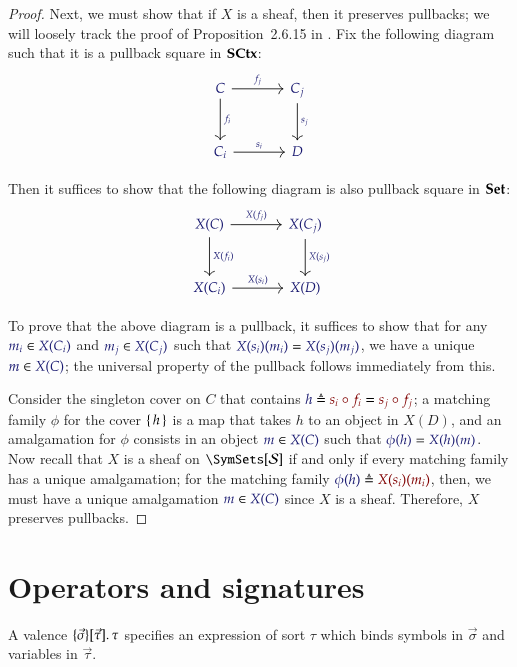 \documentclass[11pt]{article}
\theoremstyle{definition}
\theoremstyle{remark}
\numberwithin{equation}{section}
\newcommand\SCtxSite{\SymSets[\Sorts]}
\begin{document}
\begin{proof}
  Next, we must show that if $X$ is a sheaf, then it preserves pullbacks; we
  will loosely track the proof of Proposition~2.6.15 in \cite{biering:2004}.
  Fix the following diagram such that it is a pullback square in $\mathbf{SCtx}$:
  \[
    \begin{tikzcd}[sep=large]
      \IMode{C}
        \arrow[r, "\IMode{f_j}"]
        \arrow[d, "\IMode{f_i}"] &
      \IMode{C_j} \arrow[d, "\IMode{s_j}"]\\
      \IMode{C_i} \arrow[r, "\IMode{s_i}"] &
      \IMode{D}
    \end{tikzcd}
  \]

  Then it suffices to show that the following diagram is also pullback square
  in $\mathbf{Set}$:
  \[
    \begin{tikzcd}[sep=large]
      \IMode{X(C)}
        \arrow[r, "\IMode{X(f_j)}"]
        \arrow[d, "\IMode{X(f_i)}"] &
      \IMode{X(C_j)} \arrow[d, "\IMode{X(s_j)}"]\\
      \IMode{X(C_i)} \arrow[r, "\IMode{X(s_i)}"] &
      \IMode{X(D)}
    \end{tikzcd}
  \]

  To prove that the above diagram is a pullback, it suffices to show that for
  any $\Member{m_i}{X(C_i)}$ and $\Member{m_j}{X(C_j)}$ such that
  $\IsEq{X(s_i)(m_i)}{X(s_j)(m_j)}$, we have a unique $\Member{m}{X(C)}$; the
  universal property of the pullback follows immediately from this.

  Consider the singleton cover on $C$ that contains $\Define{h}{s_i\circ
  f_i}=\OMode{s_j\circ f_j}$; a matching family $\phi$ for the cover
  $\left\{\,h\,\right\}$ is a map that takes $h$ to an object in $X(D)$, and an
  amalgamation for $\phi$ consists in an object $\Member{m}{X(C)}$ such that
  $\IsEq{\phi(h)}{X(h)(m)}$. Now recall that $X$ is a sheaf on $\SCtxSite$ if
  and only if every matching family has a unique amalgamation; for the matching
  family $\Define{\phi(h)}{X(s_i)(m_i)}$, then, we must have a unique amalgamation
  $\Member{m}{X(C)}$ since $X$ is a sheaf. Therefore, $X$ preserves pullbacks.

\end{proof}


\section{Operators and signatures}

A valence $\MkValence{\vec{\sigma}}{\vec{\tau}}{\tau}$ specifies an expression
of sort $\tau$ which binds symbols in $\vec{\sigma}$ and variables in
$\vec{\tau}$.
\end{document}
